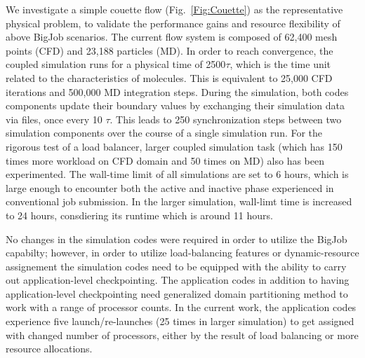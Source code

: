 \documentclass[conference,final]{IEEEtran}
\begin{document}
We investigate a simple couette flow (Fig.~\ref{Fig:Couette}) as the representative
physical problem, to validate the performance gains and 
resource flexibility of above BigJob scenarios.
The current flow system is
composed of 62,400 mesh points (CFD) and 23,188 particles (MD).
In order to reach convergence, the coupled simulation runs for a
physical time of 2500$\tau$, which is the time unit related to the characteristics of molecules. This is equivalent to 25,000 CFD iterations and 500,000 MD integration steps. During the simulation, both codes components update their boundary values by exchanging their simulation data via files, once every 10 $\tau$. This leads to 250
synchronization steps between two simulation components over
the course of a single simulation run. For the rigorous test of a load balancer, larger coupled simulation task (which has 150 times more workload on CFD domain and 50 times on MD) also has been experimented. The wall-time limit of all simulations are set to 6 hours, which is large enough to encounter both the active and inactive phase experienced in conventional job submission. In the larger simulation, wall-limt time is increased to 24 hours, consdiering its runtime which is around 11 hours.



No changes in the simulation codes were required in order
to utilize the BigJob capabilty; however, in order
to utilize load-balancing features or dynamic-resource
assignement the simulation codes need to be equipped
with the ability to carry out application-level checkpointing.
The application codes in addition to having application-level
checkpointing need generalized domain partitioning method to work
with a range of processor counts. In the current work, the application codes experience five launch/re-launches (25 times in larger simulation) to get assigned with changed number of processors, either by the result of load balancing or more resource allocations.

\end{document}
